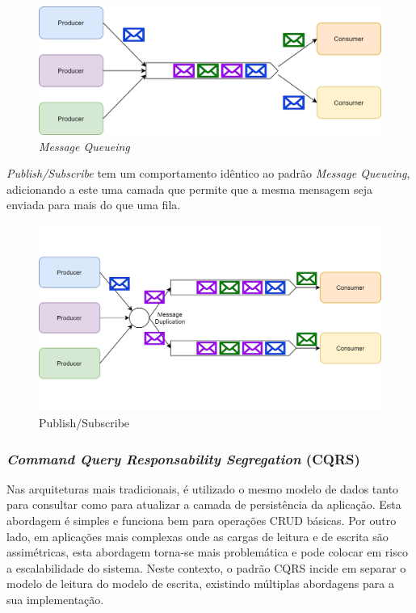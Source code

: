 \begin{figure}[H]
    \begin{center}
    \includegraphics[width=1\textwidth]{figures/message_queueing.png}
    \caption{\emph{Message Queueing}}
    \end{center}
\end{figure}

\emph{Publish/Subscribe} \label{publish_subscribe} tem um comportamento idêntico ao padrão \emph{Message Queueing}, adicionando a este uma camada que permite que a mesma mensagem seja enviada para mais do que uma fila.

\begin{figure}[H]
    \begin{center}
    \includegraphics[width=1\textwidth]{figures/pub_sub.png}
    \caption{Publish/Subscribe}
    \end{center}
\end{figure}

\subsubsection{\emph{Command Query Responsability Segregation} (CQRS)} \label{cqrs}
Nas arquiteturas mais tradicionais, é utilizado o mesmo modelo de dados tanto para consultar como para atualizar a camada de persistência da aplicação. Esta abordagem é simples e funciona bem para operações CRUD básicas. Por outro lado, em aplicações mais complexas onde as cargas de leitura e de escrita são assimétricas, esta abordagem torna-se mais problemática e pode colocar em risco a escalabilidade do sistema. Neste contexto, o padrão CQRS incide em separar o modelo de leitura do modelo de escrita, existindo múltiplas abordagens para a sua implementação. \cite{cqrs}

